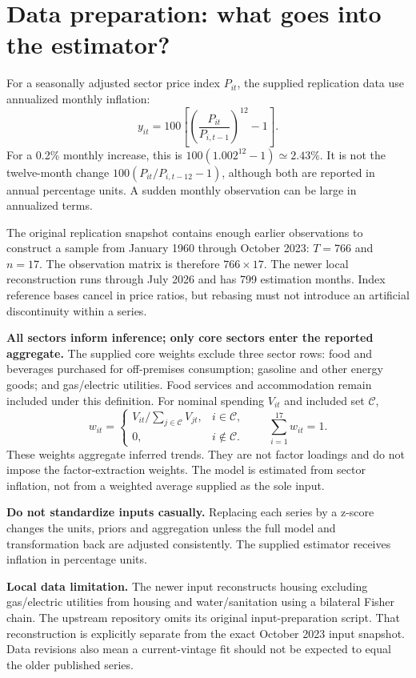 \documentclass[11pt,a4paper]{article}
\begin{document}
\newpage
\section{Data preparation: what goes into the estimator?}
For a seasonally adjusted sector price index $P_{it}$, the supplied replication data use annualized monthly inflation:
\begin{equation}
y_{it}=100\left[\left(\frac{P_{it}}{P_{i,t-1}}\right)^{12}-1\right].
\end{equation}
For a 0.2\% monthly increase, this is $100(1.002^{12}-1)\simeq2.43\%$. It is not the twelve-month change $100(P_{it}/P_{i,t-12}-1)$, although both are reported in annual percentage units. A sudden monthly observation can be large in annualized terms.

The original replication snapshot contains enough earlier observations to construct a sample from January 1960 through October 2023: $T=766$ and $n=17$. The observation matrix is therefore $766\times17$. The newer local reconstruction runs through July 2026 and has 799 estimation months. Index reference bases cancel in price ratios, but rebasing must not introduce an artificial discontinuity within a series.

\textbf{All sectors inform inference; only core sectors enter the reported aggregate.} The supplied core weights exclude three sector rows: food and beverages purchased for off-premises consumption; gasoline and other energy goods; and gas/electric utilities. Food services and accommodation remain included under this definition. For nominal spending $V_{it}$ and included set $\mathcal C$,
\[
w_{it}=\begin{cases}
V_{it}/\sum_{j\in\mathcal C}V_{jt},&i\in\mathcal C,\\
0,&i\notin\mathcal C.
\end{cases}
\qquad \sum_{i=1}^{17}w_{it}=1.
\]
These weights aggregate inferred trends. They are not factor loadings and do not impose the factor-extraction weights. The model is estimated from sector inflation, not from a weighted average supplied as the sole input.

\textbf{Do not standardize inputs casually.} Replacing each series by a z-score changes the units, priors and aggregation unless the full model and transformation back are adjusted consistently. The supplied estimator receives inflation in percentage units.

\textbf{Local data limitation.} The newer input reconstructs housing excluding gas/electric utilities from housing and water/sanitation using a bilateral Fisher chain. The upstream repository omits its original input-preparation script. That reconstruction is explicitly separate from the exact October 2023 input snapshot. Data revisions also mean a current-vintage fit should not be expected to equal the older published series.
\end{document}
